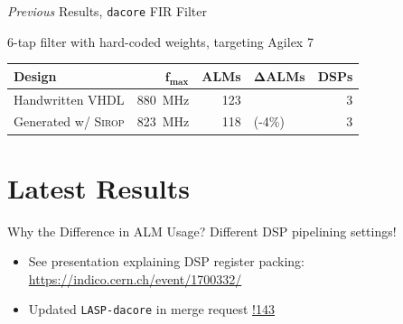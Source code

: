 \documentclass[fleqn]{beamer}
\newcommand{\dspmergerequest}{\href{https://gitlab.cern.ch/atlas-lar-be-firmware/LASP/LASP-dacore/-/merge_requests/143}{!143}\xspace}
\newcommand{\dsppackingpresentation}{\url{https://indico.cern.ch/event/1700332/}\xspace}
\newcommand{\ourlang}{\textsc{Sirop}\xspace}
\begin{document}
\begin{frame}{\emph{Previous} Results, \texttt{dacore} FIR Filter}
    \begin{center}
        6-tap filter with hard-coded weights, targeting Agilex 7

        \vspace{\baselineskip}

        \begin{tabular}{lrrlr}
            \toprule
            \textbf{Design}                         & $\textbf{f}_{\textbf{max}}$   & \textbf{ALMs}         & $\mathbf{\Delta{}ALMs}$           & \textbf{DSPs} \\
            \midrule
            Handwritten VHDL\footnotemark[1]        & \qty{880}{\mega\hertz}        & 123\footnotemark[3]   &                                   & 3 \\
            Generated w/ \ourlang\footnotemark[2]   & \qty{823}{\mega\hertz}        & 118\footnotemark[3]   & \textcolor{deltablue}{(-4\%)}     & 3 \\
            \bottomrule
        \end{tabular}
    \end{center}
    \vspace{\baselineskip}
    \footnotetext[2]{\ourlang v1.3.0}
\end{frame}

\section*{Latest Results}

\begin{frame}{Why the Difference in ALM Usage?}
    Different DSP pipelining settings!
    \begin{itemize}
        \item See presentation explaining DSP register packing: \dsppackingpresentation
        \item Updated \texttt{LASP-dacore} in merge request \dspmergerequest
    \end{itemize}
\end{frame}
\end{document}

